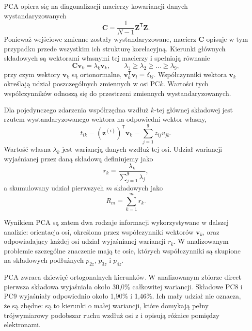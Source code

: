 \documentclass[12pt,letterpaper,oneside]{report}
\numberwithin{equation}{chapter}
\numberwithin{figure}{chapter}
\numberwithin{table}{chapter}
\begin{document}
PCA opiera się na diagonalizacji macierzy kowariancji danych
wystandaryzowanych
\begin{equation}
\mathbf C=\frac{1}{N-1}\mathbf Z^{\mathsf T}\mathbf Z.
\label{eq:pca-covariance}
\end{equation}
Ponieważ wejściowe zmienne zostały wystandaryzowane, macierz
$\mathbf C$ opisuje w tym przypadku przede wszystkim ich strukturę
korelacyjną. Kierunki głównych składowych są wektorami własnymi tej
macierzy i spełniają równanie
\begin{equation}
\mathbf C\mathbf v_k=\lambda_k\mathbf v_k,
\qquad
\lambda_1\geq\lambda_2\geq\ldots\geq\lambda_9,
\label{eq:pca-eigenproblem}
\end{equation}
przy czym wektory $\mathbf v_k$ są ortonormalne,
$\mathbf v_k^{\mathsf T}\mathbf v_l=\delta_{kl}$. Współczynniki
wektora $\mathbf v_k$ określają udział poszczególnych zmiennych w osi
$\mathrm{PC}k$. Wartości tych współczynników odnoszą się do przestrzeni
zmiennych wystandaryzowanych.

Dla pojedynczego zdarzenia współrzędna wzdłuż $k$-tej głównej składowej
jest rzutem wystandaryzowanego wektora na odpowiedni wektor własny,
\begin{equation}
t_{ik}=(\mathbf z^{(i)})^{\mathsf T}\mathbf v_k
      =\sum_{j=1}^{9}z_{ij}v_{jk}.
\label{eq:pca-score}
\end{equation}
Wartość własna $\lambda_k$ jest wariancją danych wzdłuż tej osi.
Udział wariancji wyjaśnianej przez daną składową definiujemy jako
\begin{equation}
r_k=\frac{\lambda_k}{\sum_{j=1}^{9}\lambda_j},
\label{eq:pca-explained-variance}
\end{equation}
a skumulowany udział pierwszych $m$ składowych jako
\begin{equation}
R_m=\sum_{k=1}^{m}r_k.
\label{eq:pca-cumulative-variance}
\end{equation}

Wynikiem PCA są zatem dwa rodzaje informacji wykorzystywane w dalszej
analizie: orientacja osi, określona przez współczynniki wektorów
$\mathbf v_k$, oraz odpowiadający każdej osi udział wyjaśnianej
wariancji $r_k$. W analizowanym problemie szczególne znaczenie mają te
osie, których współczynniki są skupione na składowych podłużnych
$p_{2z}$, $p_{3z}$ i $p_{4z}$.

PCA zwraca dziewięć ortogonalnych kierunków. W analizowanym zbiorze
direct pierwsza składowa wyjaśniała około 30,0\% całkowitej wariancji.
Składowe PC8 i PC9 wyjaśniały odpowiednio około 1,90\% i 1,46\%. Ich
mały udział nie oznacza, że są zbędne: są to kierunki o małej wariancji,
które domykają pełny trójwymiarowy podobszar ruchu wzdłuż osi z i
opisują różnice pomiędzy elektronami.
\end{document}
